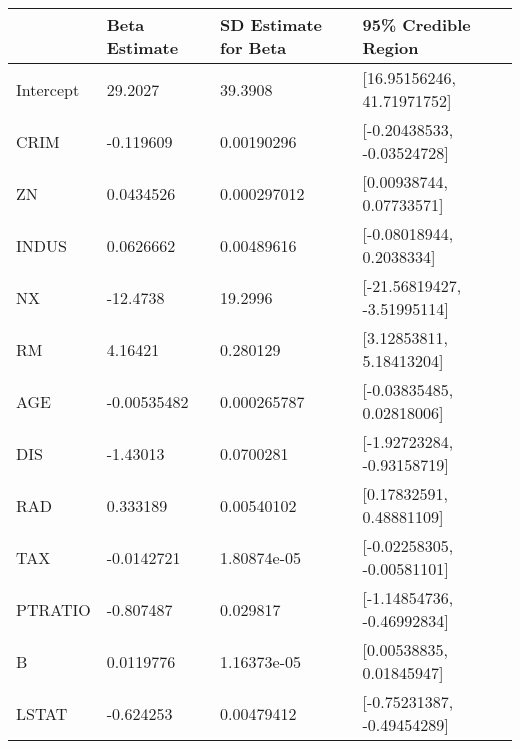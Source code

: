 \begin{tabular}{llll}
\hline
           & Beta Estimate   & SD Estimate for Beta   & 95\% Credible Region         \\
\hline
 Intercept & 29.2027         & 39.3908                & [16.95156246, 41.71971752]  \\
 CRIM      & -0.119609       & 0.00190296             & [-0.20438533, -0.03524728]  \\
 ZN        & 0.0434526       & 0.000297012            & [0.00938744, 0.07733571]    \\
 INDUS     & 0.0626662       & 0.00489616             & [-0.08018944, 0.2038334]    \\
 NX        & -12.4738        & 19.2996                & [-21.56819427, -3.51995114] \\
 RM        & 4.16421         & 0.280129               & [3.12853811, 5.18413204]    \\
 AGE       & -0.00535482     & 0.000265787            & [-0.03835485, 0.02818006]   \\
 DIS       & -1.43013        & 0.0700281              & [-1.92723284, -0.93158719]  \\
 RAD       & 0.333189        & 0.00540102             & [0.17832591, 0.48881109]    \\
 TAX       & -0.0142721      & 1.80874e-05            & [-0.02258305, -0.00581101]  \\
 PTRATIO   & -0.807487       & 0.029817               & [-1.14854736, -0.46992834]  \\
 B         & 0.0119776       & 1.16373e-05            & [0.00538835, 0.01845947]    \\
 LSTAT     & -0.624253       & 0.00479412             & [-0.75231387, -0.49454289]  \\
\hline
\end{tabular}